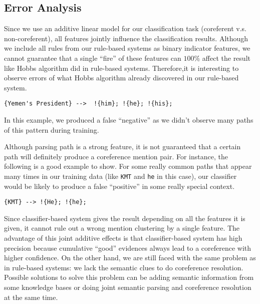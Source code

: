 \documentclass[letterpaper]{article}
\begin{document}
\subsection{Error Analysis}
Since we use an additive linear model for our classification task (coreferent v.s. non-coreferent), all features jointly influence the classification results.
Although we include all rules from our rule-based systems as binary indicator features, we cannot guarantee that a single ``fire'' of these features can $100\%$ affect the result like Hobbs algorithm did in rule-based systems.
Therefore,it is interesting to observe errors of what Hobbs algorithm already discovered in our rule-based system.
\begin{verbatim}
{Yemen's President} -->  !{him}; !{he}; !{his}; 
\end{verbatim}
In this example, we produced a false ``negative'' as we didn't observe many paths of this pattern during training.

\vspace{0.1cm}

Although parsing path is a strong feature, it is not guaranteed that a certain path will definitely produce a coreference mention pair. For instance, the following is a good example to show. For some really common paths that appear many times in our training data (like \texttt{KMT} and \texttt{he} in this case), our classifier would be likely to produce a false ``positive'' in some really special context.
\begin{verbatim}
{KMT} --> !{He}; !{he};
\end{verbatim}
Since classifier-based system gives the result depending on all the features it is given, it cannot rule out a wrong mention clustering by a single feature.
The advantage of this joint additive effects is that classifier-based system has high precision because cumulative ``good'' evidences always lead to a coreference with higher confidence. On the other hand, we are still faced with the same problem as in rule-based systems: we lack the semantic clues to do coreference resolution. Possible solutions to solve this problem can be adding semantic information from some knowledge bases or doing joint semantic parsing and coreference resolution at the same time.
\end{document}
